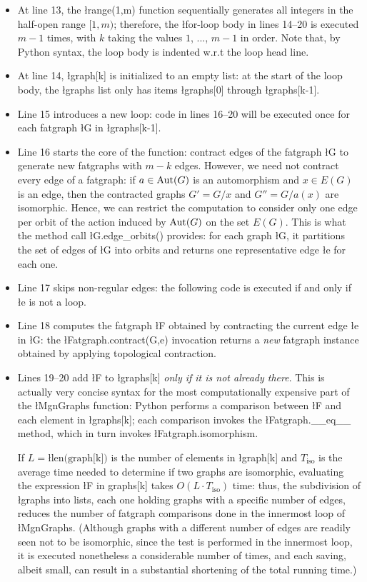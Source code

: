 \begin{itemize}
\item At line 13, the \l{range(1,m)} function sequentially generates
  all integers in the half-open range $[1, m)$; therefore, the
  \l{for}-loop body in lines 14--20 is executed $m-1$ times, with $k$
  taking the values $1$, ..., $m-1$ in order.  Note that, by Python
  syntax, the loop body is indented w.r.t the loop head line.
\item At line 14, \l{graph[k]} is initialized to an empty list:
  at the start of the loop body, the \l{graphs} list only has items
  \l{graphs[0]} through \l{graphs[k-1]}.
\item Line 15 introduces a new loop: code in lines 16--20 will be
  executed once for each fatgraph \l{G} in \l{graphs[k-1]}.
\item Line 16 starts the core of the function: contract edges of
  the fatgraph \l{G} to generate new fatgraphs with $m-k$ edges.
  However, we need not contract every edge of a fatgraph: if $a \in
  \operatorname{Aut}(G)$ is an automorphism and $x \in E(G)$ is an edge, then the
  contracted graphs $G' = G/x$ and $G'' = G/a(x)$ are isomorphic.
  Hence, we can restrict the computation to consider only one edge per
  orbit of the action induced by $\operatorname{Aut}(G)$ on the set $E(G)$. This is
  what the method call \l{G.edge_orbits()} provides: for each graph
  \l{G}, it partitions the set of edges of \l{G} into orbits and
  returns one representative edge \l{e} for each one.
\item Line 17 skips non-regular edges: the following code is executed
  if and only if \l{e} is not a loop.
\item Line 18 computes the fatgraph \l{F} obtained by contracting the
  current edge \l{e} in \l{G}: the \l{Fatgraph.contract(G,e)} invocation
  returns a \emph{new} fatgraph instance obtained by applying
  topological contraction.
\item Lines 19--20 add \l{F} to \l{graphs[k]} \emph{only if it is not
    already there}.  This is actually very concise syntax for the most
  computationally expensive part of the \l{MgnGraphs} function: Python
  performs a comparison between \l{F} and each element in
  \l{graphs[k]}; each comparison invokes the \l{Fatgraph.__eq__}
  method, which in turn invokes \l{Fatgraph.isomorphism}.  

  If $L = \text{\l{len(graph[k])}}$ is the number of elements in
  \l{graph[k]} and $T_\text{iso}$ is the average time needed to
  determine if two graphs are isomorphic, evaluating the expression
  \l{F in graphs[k]} takes $O(L \cdot T_\text{iso})$ time: thus, the
  subdivision of \l{graphs} into lists, each one holding graphs with a
  specific number of edges, reduces the number of fatgraph comparisons
  done in the innermost loop of \l{MgnGraphs}.  (Although graphs with
  a different number of edges are readily seen not to be isomorphic,
  since the test is performed in the innermost loop, it is executed
  nonetheless a considerable number of times, and each saving, albeit
  small, can result in a substantial shortening of the total running
  time.)
\end{itemize}

